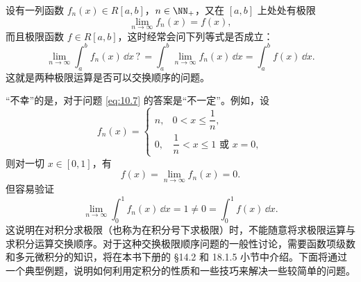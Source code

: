 设有一列函数 $f_n(x)\in R[a,b]$，$n\in\NN_+$，又在 $[a,b]$ 上处处有极限
\[
  \lim_{n\to\infty}f_n(x)=f(x),
\]
而且极限函数 $f\in R[a,b]$，这时经常会问下列等式是否成立：
\begin{equation}
  \lim_{n\to\infty}\int_a^b f_n(x)\,\dd x
  \mathrel{?}=\int_a^b\lim_{n\to\infty}f_n(x)\,\dd x
  =\int_a^b f(x)\,\dd x.
  \tag{10.7}
  \label{eq:10.7}
\end{equation}
这就是两种极限运算是否可以交换顺序的问题。

“不幸”的是，对于问题 \eqref{eq:10.7} 的答案是“不一定”。例如，设
\[
  f_n(x)=
  \begin{cases}
    n,&0<x\leqslant\dfrac1n,\\
    0,&\dfrac1n<x\leqslant1\text{ 或 }x=0,
  \end{cases}
\]
则对一切 $x\in[0,1]$，有
\[
  f(x)=\lim_{n\to\infty}f_n(x)=0.
\]
但容易验证
\[
  \lim_{n\to\infty}\int_0^1 f_n(x)\,\dd x=1\ne0=\int_0^1 f(x)\,\dd x.
\]
这说明在对积分求极限（也称为在积分号下求极限）时，不能随意将求极限运算与求积分运算交换顺序。对于这种交换极限顺序问题的一般性讨论，需要函数项级数和多元微积分的知识，将在本书下册的 §14.2 和 18.1.5 小节中介绍。下面将通过一个典型例题，说明如何利用定积分的性质和一些技巧来解决一些较简单的问题。

